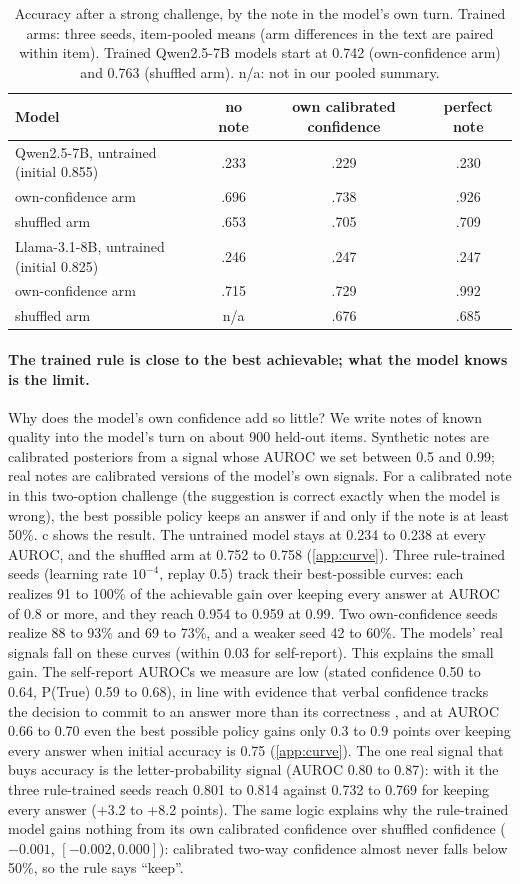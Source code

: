 \documentclass{article} %
\newcommand{\para}[1]{\paragraph{#1}}
\begin{document}
\begin{table}[t]
\caption{Accuracy after a strong challenge, by the note in the model's own turn. Trained arms: three seeds, item-pooled means (arm differences in the text are paired within item). Trained Qwen2.5-7B models start at 0.742 (own-confidence arm) and 0.763 (shuffled arm). n/a: not in our pooled summary.}
\label{tab:own}
\centering\small
\begin{tabular}{lccc}
\toprule
Model & no note & own calibrated confidence & perfect note \\
\midrule
Qwen2.5-7B, untrained (initial 0.855) & .233 & .229 & .230 \\
\quad own-confidence arm & .696 & .738 & .926 \\
\quad shuffled arm & .653 & .705 & .709 \\
Llama-3.1-8B, untrained (initial 0.825) & .246 & .247 & .247 \\
\quad own-confidence arm & .715 & .729 & .992 \\
\quad shuffled arm & n/a & .676 & .685 \\
\bottomrule
\end{tabular}
\end{table}

\para{The trained rule is close to the best achievable; what the model knows is the limit.} Why does the model's own confidence add so little? We write notes of known quality into the model's turn on about 900 held-out items. Synthetic notes are calibrated posteriors from a signal whose AUROC we set between 0.5 and 0.99; real notes are calibrated versions of the model's own signals. For a calibrated note in this two-option challenge (the suggestion is correct exactly when the model is wrong), the best possible policy keeps an answer if and only if the note is at least 50\%. c shows the result. The untrained model stays at 0.234 to 0.238 at every AUROC, and the shuffled arm at 0.752 to 0.758 (\cref{app:curve}). Three rule-trained seeds (learning rate $10^{-4}$, replay 0.5) track their best-possible curves: each realizes 91 to 100\% of the achievable gain over keeping every answer at AUROC of 0.8 or more, and they reach 0.954 to 0.959 at 0.99. Two own-confidence seeds realize 88 to 93\% and 69 to 73\%, and a weaker seed 42 to 60\%. The models' real signals fall on these curves (within 0.03 for self-report). This explains the small gain. The self-report AUROCs we measure are low (stated confidence 0.50 to 0.64, P(True) 0.59 to 0.68), in line with evidence that verbal confidence tracks the decision to commit to an answer more than its correctness \citep{kumaran2026commitment}, and at AUROC 0.66 to 0.70 even the best possible policy gains only 0.3 to 0.9 points over keeping every answer when initial accuracy is 0.75 (\cref{app:curve}). The one real signal that buys accuracy is the letter-probability signal (AUROC 0.80 to 0.87): with it the three rule-trained seeds reach 0.801 to 0.814 against 0.732 to 0.769 for keeping every answer (+3.2 to +8.2 points). The same logic explains why the rule-trained model gains nothing from its own calibrated confidence over shuffled confidence ($-0.001$, $[-0.002, 0.000]$): calibrated two-way confidence almost never falls below 50\%, so the rule says ``keep''.
\end{document}
